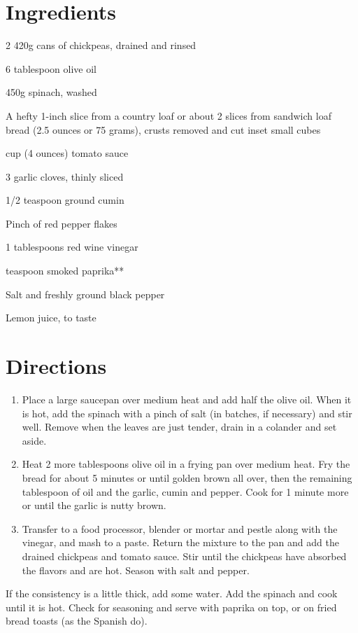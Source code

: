 \section*{Ingredients}
\begin{ingredients-list}
	\item 2 420g cans of chickpeas, drained and rinsed
	\item 6 tablespoon olive oil
	\item 450g spinach, washed
	\item A hefty 1-inch slice from a country loaf or about 2 slices from sandwich loaf bread (2.5 ounces or 75 grams), crusts removed and cut inset small cubes
	\item {} cup (4 ounces) tomato sauce
	\item 3 garlic cloves, thinly sliced
	\item 1/2 teaspoon ground cumin
	\item Pinch of red pepper flakes
	\item 1  tablespoons red wine vinegar
	\item {} teaspoon smoked paprika**
	\item Salt and freshly ground black pepper
	\item Lemon juice, to taste
\end{ingredients-list}

\section*{Directions}
\begin{enumerate}
	\item Place a large saucepan over medium heat and add half the olive oil. When it is hot, add the spinach with a pinch of salt (in batches, if necessary) and stir well.
		Remove when the leaves are just tender, drain in a colander and set aside.
	\item Heat 2 more tablespoons olive oil in a frying pan over medium heat. Fry the bread for about 5 minutes or until golden brown all over,
		 then the remaining tablespoon of oil and the garlic, cumin and pepper. Cook for 1 minute more or until the garlic is nutty brown.
	\item Transfer to a food processor, blender or mortar and pestle along with the vinegar, and mash to a paste. 
		Return the mixture to the pan and add the drained chickpeas and tomato sauce. 
		Stir until the chickpeas have absorbed the flavors and are hot. Season with salt and pepper.
\end{enumerate}
If the consistency is a little thick, add some water. Add the spinach and cook until it is hot. Check for seasoning and serve with paprika on top, or on fried bread toasts (as the Spanish do).

